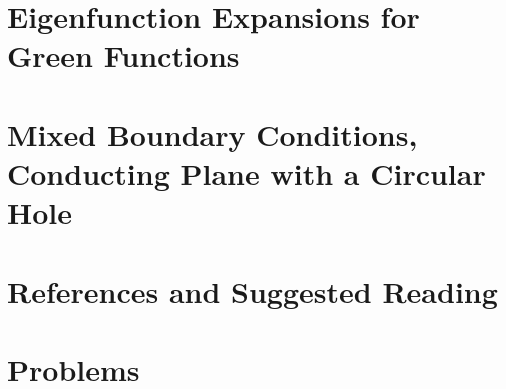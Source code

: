 \section{Eigenfunction Expansions for Green Functions}

\section{Mixed Boundary Conditions, Conducting Plane with a Circular Hole}


\section*{References and Suggested Reading}


\section*{Problems}

